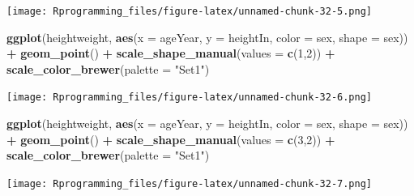 \documentclass[10pt,]{krantz}
\makeatletter
\newenvironment{Shaded}{\begin{snugshade}}{\end{snugshade}}
\newcommand{\KeywordTok}[1]{\textcolor[rgb]{0.13,0.29,0.53}{\textbf{#1}}}
\newcommand{\DataTypeTok}[1]{\textcolor[rgb]{0.13,0.29,0.53}{#1}}
\newcommand{\DecValTok}[1]{\textcolor[rgb]{0.00,0.00,0.81}{#1}}
\newcommand{\StringTok}[1]{\textcolor[rgb]{0.31,0.60,0.02}{#1}}
\newcommand{\CommentTok}[1]{\textcolor[rgb]{0.56,0.35,0.01}{\textit{#1}}}
\newcommand{\OtherTok}[1]{\textcolor[rgb]{0.56,0.35,0.01}{#1}}
\newcommand{\OperatorTok}[1]{\textcolor[rgb]{0.81,0.36,0.00}{\textbf{#1}}}
\newcommand{\NormalTok}[1]{#1}
\newenvironment{kframe}{%
\medskip{}
\setlength{\fboxsep}{.8em}
 \def\at@end@of@kframe{}%
 \ifinner\ifhmode%
  \def\at@end@of@kframe{\end{minipage}}%
  \begin{minipage}{\columnwidth}%
 \fi\fi%
 \def\FrameCommand##1{\hskip\@totalleftmargin \hskip-\fboxsep
 \colorbox{shadecolor}{##1}\hskip-\fboxsep
     \hskip-\linewidth \hskip-\@totalleftmargin \hskip\columnwidth}%
 \MakeFramed {\advance\hsize-\width
   \@totalleftmargin\z@ \linewidth\hsize
   \@setminipage}}%
 {\par\unskip\endMakeFramed%
 \at@end@of@kframe}
\renewenvironment{Shaded}{\begin{kframe}}{\end{kframe}}
\theoremstyle{definition}
\theoremstyle{definition}
\theoremstyle{remark}
\makeatother
\begin{document}
\texttt{[image: Rprogramming\_files/figure-latex/unnamed-chunk-32-5.png]}

\begin{Shaded}
\begin{Highlighting}[]


\KeywordTok{ggplot}\NormalTok{(heightweight, }\KeywordTok{aes}\NormalTok{(}\DataTypeTok{x =}\NormalTok{ ageYear, }\DataTypeTok{y =}\NormalTok{ heightIn, }\DataTypeTok{color =}\NormalTok{ sex, }\DataTypeTok{shape =}\NormalTok{ sex)) }\OperatorTok{+}\StringTok{ }\KeywordTok{geom_point}\NormalTok{() }\OperatorTok{+}
\StringTok{  }\KeywordTok{scale_shape_manual}\NormalTok{(}\DataTypeTok{values =} \KeywordTok{c}\NormalTok{(}\DecValTok{1}\NormalTok{,}\DecValTok{2}\NormalTok{)) }\OperatorTok{+}\StringTok{ }\KeywordTok{scale_color_brewer}\NormalTok{(}\DataTypeTok{palette =} \StringTok{"Set1"}\NormalTok{)}
\end{Highlighting}
\end{Shaded}

\texttt{[image: Rprogramming\_files/figure-latex/unnamed-chunk-32-6.png]}

\begin{Shaded}
\begin{Highlighting}[]


\KeywordTok{ggplot}\NormalTok{(heightweight, }\KeywordTok{aes}\NormalTok{(}\DataTypeTok{x =}\NormalTok{ ageYear, }\DataTypeTok{y =}\NormalTok{ heightIn, }\DataTypeTok{color =}\NormalTok{ sex, }\DataTypeTok{shape =}\NormalTok{ sex)) }\OperatorTok{+}\StringTok{ }\KeywordTok{geom_point}\NormalTok{() }\OperatorTok{+}
\StringTok{  }\KeywordTok{scale_shape_manual}\NormalTok{(}\DataTypeTok{values =} \KeywordTok{c}\NormalTok{(}\DecValTok{3}\NormalTok{,}\DecValTok{2}\NormalTok{)) }\OperatorTok{+}\StringTok{ }\KeywordTok{scale_color_brewer}\NormalTok{(}\DataTypeTok{palette =} \StringTok{"Set1"}\NormalTok{)}
\end{Highlighting}
\end{Shaded}

\texttt{[image: Rprogramming\_files/figure-latex/unnamed-chunk-32-7.png]}

\begin{Shaded}
\end{Shaded}
\end{document}
